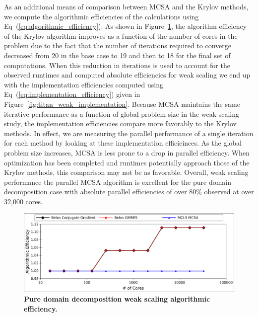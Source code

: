 As an additional means of comparison between MCSA and the Krylov
methods, we compute the algorithmic efficiencies of the calculations
using Eq~(\ref{eq:algorithmic_efficiency}). As shown in
Figure~\ref{fig:titan_weak_algorithmic}, the algorithm efficiency of
the Krylov algorithm improves as a function of the number of cores in
the problem due to the fact that the number of iterations required to
converge decreased from 20 in the base case to 19 and then to 18 for
the final set of computations. When this reduction in iterations is
used to account for the observed runtimes and computed absolute
efficiencies for weak scaling we end up with the implementation
efficiencies computed using Eq~(\ref{eq:implementation_efficiency})
given in Figure~\ref{fig:titan_weak_implementation}. Because MCSA
maintains the same iterative performance as a function of global
problem size in the weak scaling study, the implementation
efficiencies compare more favorably to the Krylov methods. In effect,
we are measuring the parallel performance of a single iteration for
each method by looking at these implementation efficieinces. As the
global problem size increases, MCSA is less prone to a drop in
parallel efficiency. When optimization has been completed and runtimes
potentially approach those of the Krylov methods, this comparison may
not be as favorable. Overall, weak scaling performance the parallel
MCSA algorithm is excellent for the pure domain decomposition case
with absolute parallel efficiencies of over 80\% observed at over
32,000 cores.

\begin{figure}[t!]
  \begin{center}
    \includegraphics[width=6in]{chapters/parallel_mc/titan_weak_alg_eff.pdf}
  \end{center}
  \caption{\textbf{Pure domain decomposition weak scaling algorithmic
      efficiency.}}
  \label{fig:titan_weak_algorithmic}
\end{figure}


